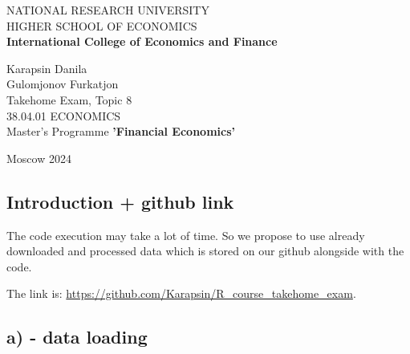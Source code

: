 \documentclass[
]{article}
\author{}
\date{\vspace{-2.5em}}
\begin{document}
\allsectionsfont{\centering}
\subsectionfont{\raggedright}
\subsubsectionfont{\raggedright}


\begin{centering}

\vspace{3cm}

\vspace{1cm}

\Large
{NATIONAL RESEARCH UNIVERSITY \\ HIGHER SCHOOL OF ECONOMICS}
\normalsize
\\
{\bf International College of Economics and Finance}
\vspace{1cm}


\Large
\doublespacing
Karapsin Danila\\
Gulomjonov Furkatjon\\
\normalsize
Takehome Exam, Topic 8\\
38.04.01 ECONOMICS\\
Master's Programme {\bf 'Financial Economics'}

\vspace{1 cm}

\normalsize
\singlespacing


\mbox{}
\vfill
\normalsize
Moscow 2024

\end{centering}

\newpage

\setcounter{page}{2}

\tableofcontents

\newpage

\subsection{Introduction + github link}\label{introduction-github-link}

The code execution may take a lot of time. So we propose to use already
downloaded and processed data which is stored on our github alongside
with the code.

The link is: \url{https://github.com/Karapsin/R_course_takehome_exam}.

\newpage

\subsection{a) - data loading}\label{a---data-loading}
\end{document}
